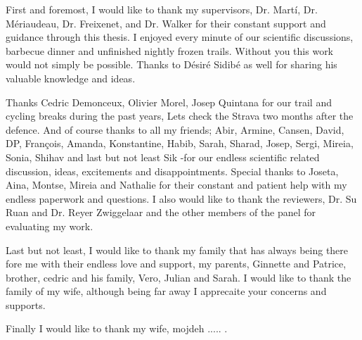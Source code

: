 

\begin{acknowledgements}      %
First and foremost, I would like to thank my supervisors, Dr. Mart\'i, Dr. M\'eriaudeau, Dr. Freixenet, and Dr. Walker for their constant support and guidance through this thesis.
I enjoyed every minute of our scientific discussions, barbecue dinner and unfinished nightly frozen trails.  
Without you this work would not simply be possible. 
Thanks to D\'esir\'e Sidib\'e as well for sharing his valuable knowledge and ideas. 

Thanks Cedric Demonceux, Olivier Morel, Josep Quintana for our trail and cycling breaks during the past years, Lets check the Strava two months after the defence.
And of course thanks to all my friends; Abir, Armine, Cansen, David, DP, Fran\c{c}ois, Amanda, Konstantine, Habib, Sarah, Sharad, Josep, Sergi, Mireia, Sonia, Shihav and last but not least Sik -for our endless scientific related discussion, ideas, excitements and disappointments.
Special thanks to Joseta, Aina, Montse, Mireia and Nathalie for their constant and patient help with my endless paperwork and questions.
I also would like to thank the reviewers, Dr. Su Ruan and Dr. Reyer Zwiggelaar and the other members of the panel for evaluating my work.

Last but not least, I would like to thank my family that has always being there fore me with their endless love and support, my parents, Ginnette and Patrice, brother, cedric and his family, Vero, Julian and Sarah. 
I would like to thank the family of my wife, although being far away I apprecaite your concerns and supports. 

Finally I would like to thank my wife, mojdeh ..... . 

   

\end{acknowledgements}




